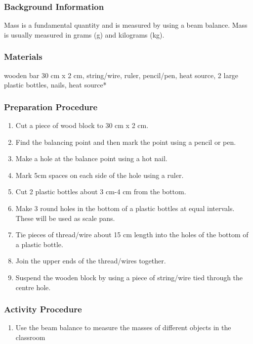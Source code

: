 \subsubsection*{Background Information}
Mass is a fundamental quantity and is measured by using a beam balance. Mass is usually measured in grams (g) and kilograms (kg).

\subsubsection*{Materials}
wooden bar 30 cm x 2 cm, string/wire, ruler, pencil/pen, heat source, 2 large plastic bottles, nails, heat source*

\subsubsection*{Preparation Procedure}
\begin{enumerate}
\item{Cut a piece of wood block to 30 cm x 2 cm.} 
\item{Find the balancing point and then mark the point using a pencil or pen.} 
\item{Make a hole at the balance point using a hot nail.} 
\item{Mark 5cm spaces on each side of the hole using a ruler.} 
\item{Cut 2 plastic bottles about 3 cm-4 cm from the bottom.} 
\item{Make 3 round holes in the bottom of a plastic bottles at equal intervals. These will be used as scale pans.} 
\item{Tie pieces of thread/wire about 15 cm length into the holes of the bottom of a plastic bottle.} 
\item{Join the upper ends of the thread/wires together.} 
\item{Suspend the wooden block by using a piece of string/wire tied through the centre hole.} 
\end{enumerate}



\subsubsection*{Activity Procedure}
\begin{enumerate}
\item{Use the beam balance to measure the masses of different objects in the classroom}
\end{enumerate}

